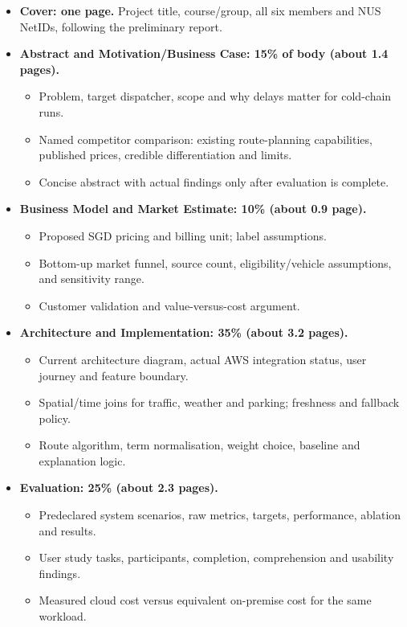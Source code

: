 \documentclass[11pt,a4paper]{article}
\begin{document}
\begin{itemize}
  \item \textbf{Cover: one page.} Project title, course/group, all six members and NUS NetIDs, following the preliminary report.
  \item \textbf{Abstract and Motivation/Business Case: 15\% of body (about 1.4 pages).}
    \begin{itemize}
      \item Problem, target dispatcher, scope and why delays matter for cold-chain runs.
      \item Named competitor comparison: existing route-planning capabilities, published prices, credible differentiation and limits.
      \item Concise abstract with actual findings only after evaluation is complete.
    \end{itemize}
  \item \textbf{Business Model and Market Estimate: 10\% (about 0.9 page).}
    \begin{itemize}
      \item Proposed SGD pricing and billing unit; label assumptions.
      \item Bottom-up market funnel, source count, eligibility/vehicle assumptions, and sensitivity range.
      \item Customer validation and value-versus-cost argument.
    \end{itemize}
  \item \textbf{Architecture and Implementation: 35\% (about 3.2 pages).}
    \begin{itemize}
      \item Current architecture diagram, actual AWS integration status, user journey and feature boundary.
      \item Spatial/time joins for traffic, weather and parking; freshness and fallback policy.
      \item Route algorithm, term normalisation, weight choice, baseline and explanation logic.
    \end{itemize}
  \item \textbf{Evaluation: 25\% (about 2.3 pages).}
    \begin{itemize}
      \item Predeclared system scenarios, raw metrics, targets, performance, ablation and results.
      \item User study tasks, participants, completion, comprehension and usability findings.
      \item Measured cloud cost versus equivalent on-premise cost for the same workload.

\end{itemize}
\end{itemize}
\end{document}
